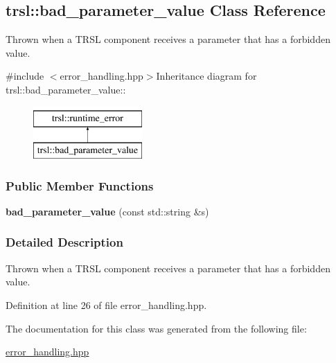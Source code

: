 \hypertarget{classtrsl_1_1bad__parameter__value}{
\subsection{trsl::bad\_\-parameter\_\-value Class Reference}
\label{classtrsl_1_1bad__parameter__value}
}


Thrown when a TRSL component receives a parameter that has a forbidden value.  


{\ttfamily \#include $<$error\_\-handling.hpp$>$}Inheritance diagram for trsl::bad\_\-parameter\_\-value::\begin{figure}[H]
\begin{center}
\leavevmode
\includegraphics[height=2cm]{classtrsl_1_1bad__parameter__value}
\end{center}
\end{figure}
\subsubsection*{Public Member Functions}
\begin{DoxyCompactItemize}
\item 
\hypertarget{classtrsl_1_1bad__parameter__value_a938a92ccc784ed61c10f641705d8bf24}{
{\bfseries bad\_\-parameter\_\-value} (const std::string \&s)}
\label{classtrsl_1_1bad__parameter__value_a938a92ccc784ed61c10f641705d8bf24}

\end{DoxyCompactItemize}


\subsubsection{Detailed Description}
Thrown when a TRSL component receives a parameter that has a forbidden value. 

Definition at line 26 of file error\_\-handling.hpp.

The documentation for this class was generated from the following file:\begin{DoxyCompactItemize}
\item 
\hyperlink{error__handling_8hpp}{error\_\-handling.hpp}\end{DoxyCompactItemize}
